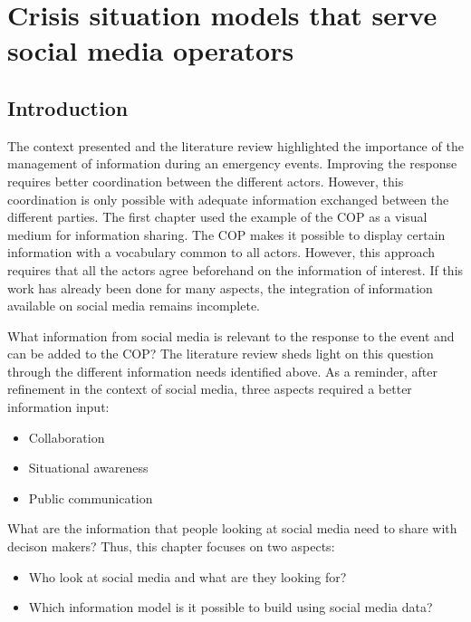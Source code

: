 \chapter{Crisis situation models that serve social media operators}

\section{Introduction}
The context presented and the literature review highlighted the importance of the management of information during an emergency events.
Improving the response requires better coordination between the different actors.
However, this coordination is only possible with adequate information exchanged between the different parties.
The first chapter used the example of the COP as a visual medium for information sharing.
The COP makes it possible to display certain information with a vocabulary common to all actors.
However, this approach requires that all the actors agree beforehand on the information of interest.
If this work has already been done for many aspects, the integration of information available on social media remains incomplete.

What information from social media is relevant to the response to the event and can be added to the COP?
The literature review sheds light on this question through the different information needs identified above.
As a reminder, after refinement in the context of social media, three aspects required a better information input:

\begin{itemize}
    \item Collaboration
    \item Situational awareness
    \item Public communication
\end{itemize}

What are the information that people looking at social media need to share with decison makers?
Thus, this chapter focuses on two aspects:

\begin{itemize}
    \item Who look at social media and what are they looking for?
    \item Which information model is it possible to build using social media data?
\end{itemize}

